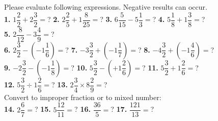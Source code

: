 \documentclass[a4paper]{article}
\newcommand{\lr}[1]{\left({#1}\right)} %
\begin{document}
\begin{Large}

Please evaluate following expressions. Negative results can occur. \\ [0.6cm]
		
\textbf{1.} $1 \dfrac{2}{2} + 2 \dfrac{3}{2} =$? \hspace{0.6cm}
\textbf{2.} $2 \dfrac{2}{5} + 1 \dfrac{8}{25} =$? \hspace{0.6cm}
\textbf{3.} $6 \dfrac{5}{15} - 5 \dfrac{1}{3} =$? \hspace{0.6cm}
\textbf{4.} $5 \dfrac{1}{8} + 1 \dfrac{3}{8} =$? \\ [0.6cm]
\textbf{5.} $2 \dfrac{8}{12} - 3 \dfrac{4}{9} =$? \\ [0.6cm]

\textbf{6.} $ 2\dfrac{3}{2}- \lr{- 1\dfrac{1}{6}}  =$? \hspace{0.6cm}
\textbf{7.} $ -3\dfrac{3}{2} + \lr{- 1\dfrac{1}{7}}  =$? \hspace{0.6cm}
\textbf{8.} $ -4\dfrac{3}{2} + \lr{- 1\dfrac{4}{6}}  =$? \\ [0.6cm]
\textbf{9.} $ -2\dfrac{3}{2}- \lr{- 1\dfrac{1}{8}}  =$? \hspace{0.6cm}
\textbf{10.} $ 5\dfrac{3}{2}- \lr{+ 1\dfrac{2}{6}}  =$? \hspace{0.6cm}
\textbf{11.} $ 5\dfrac{3}{2} + 1\dfrac{2}{6}  =$? \\ [0.6cm]
\textbf{12.} $ 5\dfrac{3}{2} \div 1\dfrac{2}{6}  =$? \hspace{0.6cm}
\textbf{13.} $ 2\dfrac{3}{4} \times 8\dfrac{2}{9}  =$? \\ [0.6cm]

Convert to improper fraction or to mixed number: \\ [0.6cm]

\textbf{14.} $2\dfrac{6}{7}=$? \hspace{0.6cm}
\textbf{15.} $5\dfrac{12}{11}=$? \hspace{0.6cm}
\textbf{16.} $\dfrac{36}{5}=$? \hspace{0.6cm}
\textbf{17.} $\dfrac{121}{13}=$?  

\end{Large}
\end{document}
